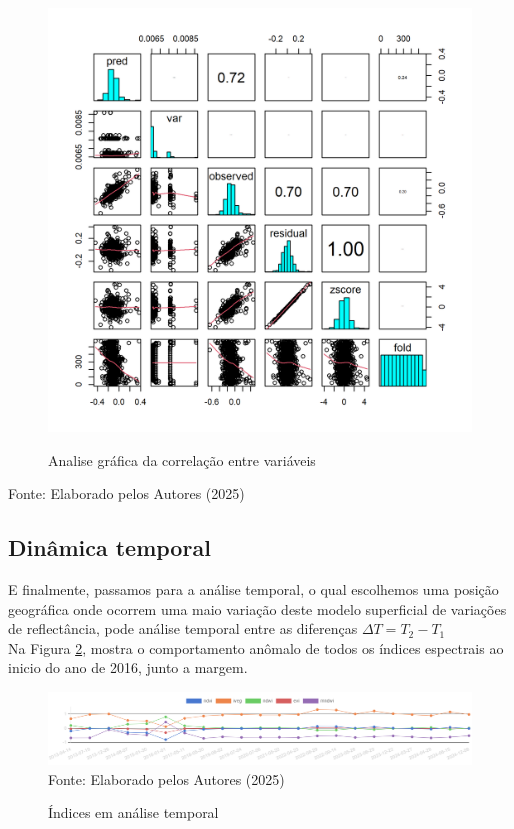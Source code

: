 			\begin{minipage}[t!]{0.32\textwidth}
					\begin{figure}[H]
					\centering  \small \caption{Analise gráfica da  correlação entre variáveis}
					\includegraphics[width=0.7\linewidth]{FIGURAS/painel-correla}
					\label{fig:painel-correla}
				\end{figure}
				
			\end{minipage} 
			 			\begin{center}
				Fonte:   Elaborado pelos Autores (2025)
			\end{center}
 
 
 
\subsection{Dinâmica temporal }
\hspace*{1.25 cm} E finalmente, passamos para a análise temporal, o qual escolhemos uma posição geográfica onde ocorrem uma maio variação deste modelo superficial de variações de reflectância, pode análise temporal entre as diferenças  \( \Delta T = T_{2}  - T_{1} \)\\
%
\hspace*{1.25 cm}  Na Figura \ref{fig:INDICES}, mostra o comportamento anômalo de todos os índices espectrais ao inicio do ano de 2016, junto a margem.\\

 \begin{figure}[H]
	\centering  \small \caption{Índices em  análise temporal}
	\includegraphics[width=0.97\linewidth]{FIGURAS/indices}
	\label{fig:INDICES}{ Fonte:   Elaborado pelos Autores (2025)}
\end{figure}


